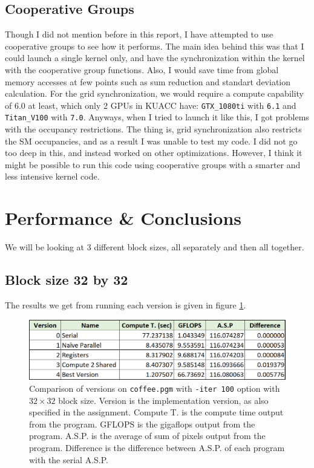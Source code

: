 \documentclass[12pt,reqno]{amsart}
\newcommand{\code}[1]{\texttt{#1}}
\begin{document}
\subsection{Cooperative Groups}
Though I did not mention before in this report, I have attempted to use cooperative groups to see how it performs. The main idea behind this was that I could launch a single kernel only, and have the synchronization within the kernel with the cooperative group functions. Also, I would save time from global memory accesses at few points such as sum reduction and standart deviation calculation. For the grid synchronization, we would require a compute capability of 6.0 at least, which only 2 GPUs in KUACC have: \code{GTX\_1080ti} with \code{6.1} and \code{Titan\_V100} with \code{7.0}. Anyways, when I tried to launch it like this, I got problems with the occupancy restrictions. The thing is, grid synchronization also restricts the SM occupancies, and as a result I was unable to test my code. I did not go too deep in this, and instead worked on other optimizations. However, I think it might be possible to run this code using cooperative groups with a smarter and less intensive kernel code.

\section{Performance \& Conclusions} 
We will be looking at 3 different block sizes, all separately and then all together. 
\subsection{Block size 32 by 32}
The results we get from running each version is given in figure \ref{fig:rescomp}.
\begin{figure}[h]
\centering
\includegraphics[width=0.9\linewidth]{allresults32.png}
\caption{Comparison of versions on \code{coffee.pgm} with \code{-iter 100} option with $32\times32$ block size. Version is the implementation version, as also specified in the assignment. Compute T. is the compute time output from the program. GFLOPS is the gigaflops output from the program. A.S.P. is the average of sum of pixels output from the program. Difference is the difference between A.S.P. of each program with the serial A.S.P.}
\label{fig:rescomp}
\end{figure}
\end{document}
